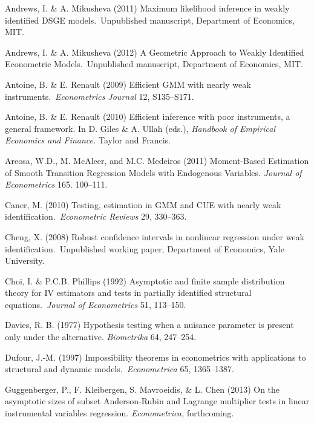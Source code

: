 \documentclass[12pt,titlepage,final,oneside,letterpaper]{article}
\begin{document}
\begin{description}
\item Andrews, I. \& A. Mikusheva (2011) Maximum likelihood inference in
weakly identified DSGE models.\ Unpublished manuscript, Department of
Economics, MIT.

\item Andrews, I. \& A. Mikusheva (2012) A Geometric Approach to Weakly
Identified Econometric Models.\ Unpublished manuscript, Department of
Economics, MIT.

\item Antoine, B. \& E. Renault (2009) Efficient GMM with nearly weak
instruments.\ \emph{Econometrics Journal }12, S135--S171.

\item Antoine, B. \& E. Renault (2010) Efficient inference with poor
instruments, a general framework. In D. Giles \& A. Ullah (eds.), \emph{%
Handbook of Empirical Economics and Finance. }Taylor and Francis.

\item Areosa, W.D., M. McAleer, and M.C. Medeiros (2011) Moment-Based
Estimation of Smooth Transition Regression Models with Endogenous Variables. 
\emph{Journal of Econometrics }165. 100--111.

\item Caner, M. (2010) Testing, estimation in GMM and CUE with nearly weak
identification.\ \emph{Econometric Reviews} 29, 330--363.

\item Cheng, X. (2008) Robust confidence intervals in nonlinear regression
under weak identification.\ Unpublished working paper, Department of
Economics, Yale University.

\item Choi, I. \& P.C.B. Phillips (1992) Asymptotic and finite sample
distribution theory for IV estimators and tests in partially identified
structural equations.\ \emph{Journal of Econometrics} 51, 113--150.

\item Davies, R. B. (1977) Hypothesis testing when a nuisance parameter is
present only under the alternative. \emph{Biometrika} 64, 247--254.

\item Dufour, J.-M. (1997) Impossibility theorems in econometrics with
applications to structural and dynamic models.\ \emph{Econometrica} 65,
1365--1387.

\item Guggenberger, P., F. Kleibergen, S. Mavroeidis, \& L. Chen (2013) On
the asymptotic sizes of subset Anderson-Rubin and Lagrange multiplier tests
in linear instrumental variables regression. \emph{Econometrica,}
forthcoming.


\end{description}
\end{document}
